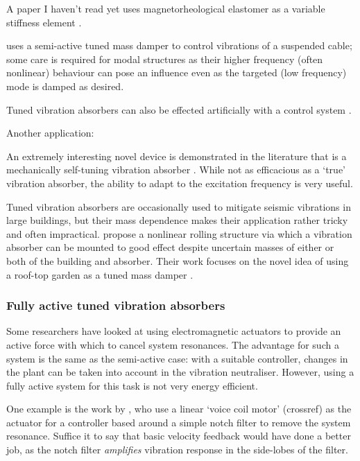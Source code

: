 A paper I haven't read yet uses magnetorheological elastomer as a variable
stiffness element \cite{holdhusen2007}.

\textcite{casciati2007} uses a semi-active tuned mass damper to
control vibrations of a suspended cable; some care is required for
modal structures as their higher frequency (often nonlinear) behaviour
can pose an influence even as the targeted (low frequency) mode is
damped as desired.

Tuned vibration absorbers can also be effected artificially with a control
system \cite{kim2008a}.

Another application: \cite{moradi2008}

An extremely interesting novel device is demonstrated in the literature that
is a mechanically self-tuning vibration absorber \cite{ivers2008}. While not
as efficacious as a `true' vibration absorber, the ability to adapt to the
excitation frequency is very useful.

Tuned vibration absorbers are occasionally used to mitigate seismic vibrations
in large buildings, but their mass dependence makes their application rather
tricky and often impractical. \textcite{matta2008} propose a nonlinear
rolling structure via which a vibration absorber can be mounted to good effect
despite uncertain masses of either or both of the building and absorber. Their
work focuses on the novel idea of using a roof-top garden as a tuned mass
damper \parencite{matta2008a}.


\subsubsection{Fully active tuned vibration absorbers}

Some researchers have looked at using electromagnetic actuators to
provide an active force with which to cancel system resonances. The
advantage for such a system is the same as the semi-active case: with
a suitable controller, changes in the plant can be taken into account
in the vibration neutraliser. However, using a fully active system for
this task is not very energy efficient.

One example is the work by \textcite{chen2005a}, who use a linear
`voice coil motor' (crossref) as the actuator for a controller based
around a simple notch filter to remove the system resonance. Suffice
it to say that basic velocity feedback would have done a better job,
as the notch filter \emph{amplifies} vibration response in the
side-lobes of the filter.

